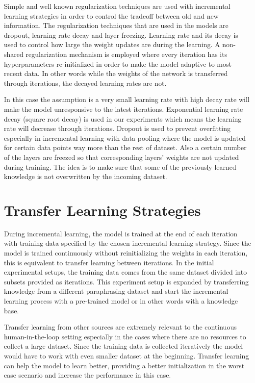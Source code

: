 Simple and well known regularization techniques are used with incremental learning strategies in order to control the tradeoff between old and new information. The regularization techniques that are used in the models are dropout, learning rate decay and layer freezing. Learning rate and its decay is used to control how large the weight updates are during the learning. A non-shared regularization mechanism is employed where every iteration has its hyperparameters re-initialized in order to make the model adaptive to most recent data. In other words while the weights of the network is transferred through iterations, the decayed learning rates are not.

In this case the assumption is a very small learning rate with high decay rate will make the model unresponsive to the latest iterations. Exponential learning rate decay (square root decay) is used in our experiments which means the learning rate will decrease through iterations. Dropout is used to prevent overfitting especially in incremental learning with data pooling where the model is updated for certain data points way more than the rest of dataset. Also a certain number of the layers are freezed so that corresponding layers' weights are not updated during training. The idea is to make sure that some of the previously learned knowledge is not overwritten by the incoming dataset. 

\section{Transfer Learning Strategies} \label{transfers}

During incremental learning, the model is trained at the end of each iteration with training data specified by the chosen incremental learning strategy. Since the model is trained continuously without reinitializing the weights in each iteration, this is equivalent to transfer learning between iterations. In the initial experimental setups, the training data comes from the same dataset divided into subsets provided as iterations. This experiment setup is expanded by transferring knowledge from a different paraphrasing dataset and start the incremental learning process with a pre-trained model or in other words with a knowledge base. 

Transfer learning from other sources are extremely relevant to the continuous human-in-the-loop setting especially in the cases where there are no resources to collect a large dataset. Since the training data is collected iteratively the model would have to work with even smaller dataset at the beginning. Transfer learning can help the model to learn better, providing a better initialization in the worst case scenario and increase the performance in this case. 


